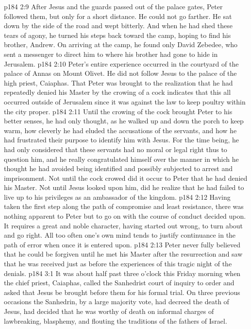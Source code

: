 \vs p184 2:9 After Jesus and the guards passed out of the palace gates, Peter followed them, but only for a short distance. He could not go farther. He sat down by the side of the road and wept bitterly. And when he had shed these tears of agony, he turned his steps back toward the camp, hoping to find his brother, Andrew. On arriving at the camp, he found only David Zebedee, who sent a messenger to direct him to where his brother had gone to hide in Jerusalem.
\vs p184 2:10 \pc Peter’s entire experience occurred in the courtyard of the palace of Annas on Mount Olivet. He did not follow Jesus to the palace of the high priest, Caiaphas. That Peter was brought to the realization that he had repeatedly denied his Master by the crowing of a cock indicates that this all occurred outside of Jerusalem since it was against the law to keep poultry within the city proper.
\vs p184 2:11 \pc Until the crowing of the cock brought Peter to his better senses, he had only thought, as he walked up and down the porch to keep warm, how cleverly he had eluded the accusations of the servants, and how he had frustrated their purpose to identify him with Jesus. For the time being, he had only considered that these servants had no moral or legal right thus to question him, and he really congratulated himself over the manner in which he thought he had avoided being identified and possibly subjected to arrest and imprisonment. Not until the cock crowed did it occur to Peter that he had denied his Master. Not until Jesus looked upon him, did he realize that he had failed to live up to his privileges as an ambassador of the kingdom.
\vs p184 2:12 Having taken the first step along the path of compromise and least resistance, there was nothing apparent to Peter but to go on with the course of conduct decided upon. It requires a great and noble character, having started out wrong, to turn about and go right. All too often one’s own mind tends to justify continuance in the path of error when once it is entered upon.
\vs p184 2:13 Peter never fully believed that he could be forgiven until he met his Master after the resurrection and saw that he was received just as before the experiences of this tragic night of the denials.
\vs p184 3:1 It was about half past three o’clock this Friday morning when the chief priest, Caiaphas, called the Sanhedrist court of inquiry to order and asked that Jesus be brought before them for his formal trial. On three previous occasions the Sanhedrin, by a large majority vote, had decreed the death of Jesus, had decided that he was worthy of death on informal charges of lawbreaking, blasphemy, and flouting the traditions of the fathers of Israel.
